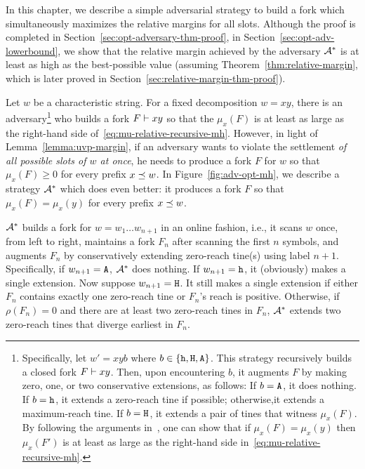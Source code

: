 

In this chapter, 
we describe a simple adversarial strategy to build a fork 
which simultaneously maximizes the relative margins for all slots. 
Although the proof is completed in Section~\ref{sec:opt-adversary-thm-proof}, 
in Section~\ref{sec:opt-adv-lowerbound}, 
we show that the relative margin achieved by the adversary $\mathcal{A}^*$ 
is at least as high as the best-possible value 
(assuming Theorem~\ref{thm:relative-margin}, which is later proved in Section~\ref{sec:relative-margin-thm-proof}).


Let $w$ be a characteristic string. 
For a fixed decomposition $w = xy$, 
there is an adversary\footnote{
  Specifically, 
  let $w' = xyb$ 
  where $b \in \{\mathtt{h}, \mathtt{H}, \mathtt{A}\}$. 
  This strategy recursively builds a closed fork $F \vdash xy$. 
  Then, upon encountering $b$, 
  it augments $F$ 
  by making zero, one, or two conservative extensions, as follows: 
  If $b = \mathtt{A}$, it does nothing. 
  If $b = \mathtt{h}$, it extends a zero-reach tine if possible; 
  otherwise,it extends a maximum-reach tine. 
  If $b = \mathtt{H}$, it extends a pair of tines that 
  witness $\mu_x(F)$. 
  By following the arguments in~\cite{LinearConsistencySODA}, 
  one can show that 
  if $\mu_x(F) = \mu_x(y)$ then 
  $\mu_x(F')$ is 
  at least as large as 
  the right-hand side in~\eqref{eq:mu-relative-recursive-mh}.   
} 
who builds a fork $F \vdash xy$ 
so that the $\mu_x(F)$ is 
at least as large as 
the right-hand side of~\eqref{eq:mu-relative-recursive-mh}. 
However, 
in light of Lemma~\ref{lemma:uvp-margin}, 
if an adversary wants to violate the settlement 
\emph{of all possible slots of $w$ at once}, 
he needs to produce a fork $F$ for $w$ 
so that $\mu_x(F) \geq 0$ 
for every prefix $x \preceq w$. 
In Figure~\ref{fig:adv-opt-mh}, 
we describe a strategy $\mathcal{A}^*$ 
which does even better: 
it produces a fork $F$ so that $\mu_x(F) = \mu_x(y)$ 
for every prefix $x \preceq w$. 


$\mathcal{A}^*$ builds a fork for $w = w_1 \ldots w_{n+1}$ 
in an online fashion, i.e., 
it scans $w$ once, from left to right, 
maintains a fork $F_n$ after scanning 
the first $n$ symbols, 
and augments $F_n$ by conservatively extending 
zero-reach tine(s) using label $n + 1$.
Specifically, if $w_{n+1} = \mathtt{A}$, $\mathcal{A}^*$ does nothing. 
If $w_{n+1} = \mathtt{h}$, it (obviously) makes a single extension. 
Now suppose $w_{n+1} = \mathtt{H}$. 
It still makes a single extension
if either $F_n$ contains exactly one zero-reach tine 
or $F_n$'s reach is positive. 
Otherwise, 
if $\rho(F_n) = 0$ 
and there are at least two zero-reach tines in $F_n$, 
$\mathcal{A}^*$ extends two zero-reach tines 
that diverge earliest in $F_n$.



